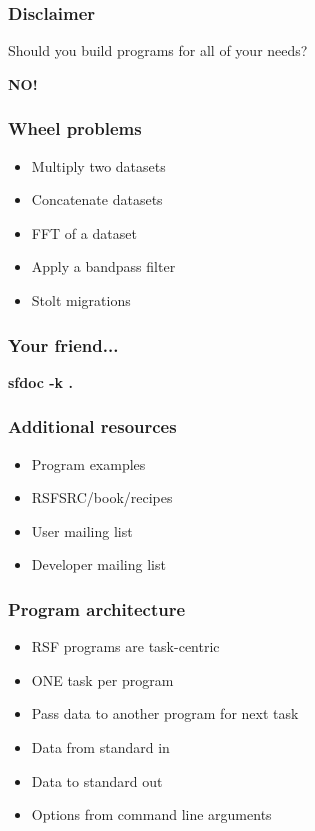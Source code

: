\begin{frame} \frametitle{Disclaimer}
Should you build programs for all of your needs?
\linebreak
\pause
\begin{center}\Huge\textbf{NO!}\end{center}
\end{frame}

\begin{frame}
\end{frame}

\begin{frame} \frametitle{Wheel problems}
\begin{itemize}
\item Multiply two datasets
\pause
\item Concatenate datasets
\pause
\item FFT of a dataset
\pause
\item Apply a bandpass filter
\pause
\item Stolt migrations
\end{itemize}
\end{frame}

\begin{frame} \frametitle{Your friend...}
\begin{center}\Huge\textbf{sfdoc -k .}\end{center}
\end{frame}

\begin{frame} \frametitle{Additional resources}
\begin{itemize}
\item Program examples
\item RSFSRC/book/recipes
\item User mailing list
\item Developer mailing list
\end{itemize}
\end{frame}




\begin{frame}
\end{frame}

\begin{frame} \frametitle{Program architecture}
\begin{itemize}
\item RSF programs are task-centric
\pause
\item ONE task per program
\pause
\item Pass data to another program for next task
\pause
\item Data from standard in 
\item Data to   standard out
\item Options from command line arguments
\end{itemize}
\end{frame}

